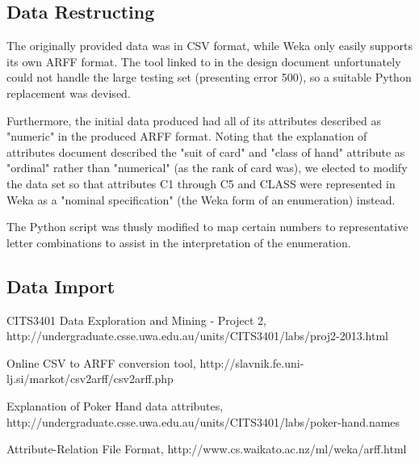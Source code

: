 \documentclass[11pt, a4paper]{article}
\begin{document}
\subsection*{Data Restructing}

The originally provided data was in CSV format, while Weka only easily supports its own ARFF format. The tool linked to in the design document \cite{arffconv} unfortunately could not handle the large testing set (presenting error 500), so a suitable Python replacement was devised.

Furthermore, the initial data produced had all of its attributes described as "numeric" in the produced ARFF format. Noting that the explanation of attributes document \cite{expattr} described the "suit of card" and "class of hand" attribute as "ordinal" rather than "numerical" (as the rank of card was), we elected to modify the data set so that attributes C1 through C5 and CLASS were represented in Weka as a "nominal specification" (the Weka form of an enumeration) instead.

The Python script was thusly modified to map certain numbers to representative letter combinations to assist in the interpretation of the enumeration.

\subsection*{Data Import}



\begin{thebibliography}{9}

	CITS3401 Data Exploration and Mining - Project 2,
	http://undergraduate.csse.uwa.edu.au/units/CITS3401/labs/proj2-2013.html

	Online CSV to ARFF conversion tool,
	http://slavnik.fe.uni-lj.si/markot/csv2arff/csv2arff.php

	Explanation of Poker Hand data attributes,
	http://undergraduate.csse.uwa.edu.au/units/CITS3401/labs/poker-hand.names

	Attribute-Relation File Format,
	http://www.cs.waikato.ac.nz/ml/weka/arff.html

\end{thebibliography}


\end{document}
